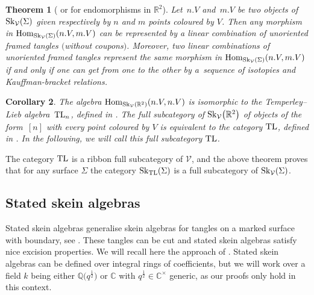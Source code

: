 \documentclass[pdftex]{sigma}%
\numberwithin{equation}{section}
\newtheorem{Theorem}{Theorem}[section]
\newtheorem{Corollary}[Theorem]{Corollary}
\newcommand{\Hom}{\operatorname{Hom}}
\begin{document}
{\sloppy\begin{Theorem}[{\cite[Theorem~12.3.10]{CP}} or {\cite[Theorem~3.3.4]{Carter}} for endomorphisms in $\mathbb{R}^2$]\label{thmSkAsTangles}
Let~$n.V$ and~$m.V$ be two objects of ${\rm Sk}_\mathcal{V}(\Sigma)$ given respectively by $n$ and $m$ points coloured by $V$. Then any morphism in $\Hom_{{\rm Sk}_\mathcal{V}(\Sigma)}(n.V,m.V)$ can be represented by a linear combination of unoriented framed tangles $($without coupons$)$. Moreover, two linear combinations of unoriented framed tangles represent the same morphism in $\Hom_{{\rm Sk}_\mathcal{V}(\Sigma)}(n.V,m.V)$ if and only if one can get from one to the other by a~sequence of isotopies and Kauffman-bracket relations.
\end{Theorem}}

\begin{Corollary}
The algebra $\Hom_{{\rm Sk}_\mathcal{V}(\mathbb{R}^2)}(n.V,n.V)$ is isomorphic to the Temperley--Lieb algebra~${\rm TL}_n$, defined in {\rm \cite[Section~XII.3]{Turaev}}. The full subcategory of ${\rm Sk}_\mathcal{V}\big(\mathbb{R}^2\big)$ of objects of the form~$[n]$ with every point coloured by $V$ is equivalent to the category ${\rm TL}$, defined in {\rm\cite[Section~XII.2]{Turaev}}. In the following, we will call this full subcategory ${\rm TL}$.
\end{Corollary}

The category ${\rm TL}$ is a ribbon full subcategory of $\mathcal{V}$, and the above theorem proves that for any surface $\Sigma$ the category ${\rm Sk}_{{\rm TL}}(\Sigma)$ is a full subcategory of ${\rm Sk}_\mathcal{V}(\Sigma)$.

\subsection{Stated skein algebras}\label{SectStatedSkein} Stated skein algebras generalise skein algebras for tangles on a marked surface with boundary, see \cite{BonahonWong,TTQLe,Muller}. These tangles can be cut and stated skein algebras satisfy nice excision properties. We will recall here the approach of \cite{Cos}. Stated skein algebras can be defined over integral rings of coefficients, but we will work over a field $k$ being either $\mathbb{Q}\big(q^{\frac{1}{2}}\big)$ or $\mathbb{C}$ with $q^{\frac{1}{2}} \in \mathbb{C}^\times$ generic, as our proofs only hold in this context.
\end{document}
